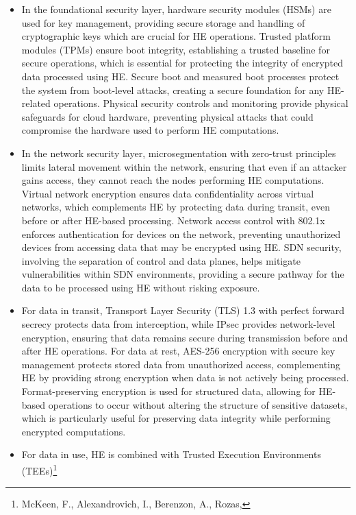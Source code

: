 \documentclass[
  letterpaper,
  DIV=11,
  numbers=noendperiod,
  oneside]{scrartcl}
\begin{document}
\begin{itemize}
\item
  In the foundational security layer, hardware security modules (HSMs)
  are used for key management, providing secure storage and handling of
  cryptographic keys which are crucial for HE operations. Trusted
  platform modules (TPMs) ensure boot integrity, establishing a trusted
  baseline for secure operations, which is essential for protecting the
  integrity of encrypted data processed using HE. Secure boot and
  measured boot processes protect the system from boot-level attacks,
  creating a secure foundation for any HE-related operations. Physical
  security controls and monitoring provide physical safeguards for cloud
  hardware, preventing physical attacks that could compromise the
  hardware used to perform HE computations.
\item
  In the network security layer, microsegmentation with zero-trust
  principles limits lateral movement within the network, ensuring that
  even if an attacker gains access, they cannot reach the nodes
  performing HE computations. Virtual network encryption ensures data
  confidentiality across virtual networks, which complements HE by
  protecting data during transit, even before or after HE-based
  processing. Network access control with 802.1x enforces authentication
  for devices on the network, preventing unauthorized devices from
  accessing data that may be encrypted using HE. SDN security, involving
  the separation of control and data planes, helps mitigate
  vulnerabilities within SDN environments, providing a secure pathway
  for the data to be processed using HE without risking exposure.
\item
  For data in transit, Transport Layer Security (TLS) 1.3 with perfect
  forward secrecy protects data from interception, while IPsec provides
  network-level encryption, ensuring that data remains secure during
  transmission before and after HE operations. For data at rest, AES-256
  encryption with secure key management protects stored data from
  unauthorized access, complementing HE by providing strong encryption
  when data is not actively being processed. Format-preserving
  encryption is used for structured data, allowing for HE-based
  operations to occur without altering the structure of sensitive
  datasets, which is particularly useful for preserving data integrity
  while performing encrypted computations.
\item
  For data in use, HE is combined with Trusted Execution Environments
  (TEEs)\footnote{McKeen, F., Alexandrovich, I., Berenzon, A., Rozas,
}
\end{itemize}
\end{document}
